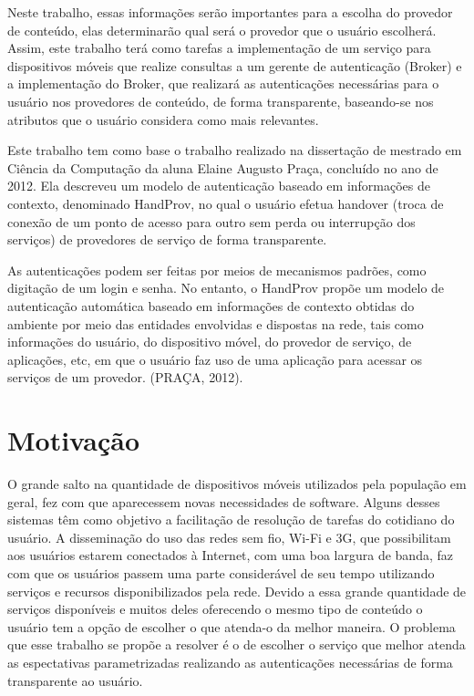 Neste trabalho, essas informações serão importantes para a escolha do provedor de conteúdo, elas determinarão qual será o provedor que o usuário escolherá. Assim, este trabalho terá como tarefas a implementação de um serviço para dispositivos móveis que realize consultas a um gerente de autenticação (Broker) e a implementação do Broker, que realizará as autenticações necessárias para o usuário nos provedores de conteúdo, de forma transparente, baseando-se nos atributos que o usuário considera como mais relevantes.

Este trabalho tem como base o trabalho realizado na dissertação de mestrado em Ciência da Computação da aluna Elaine Augusto Praça, concluído no ano de 2012. Ela descreveu um modelo de autenticação baseado em informações de contexto, denominado HandProv, no qual o usuário efetua handover (troca de conexão de um ponto de acesso para outro sem perda ou interrupção dos serviços) de provedores de serviço de forma transparente.

\begin{citacao}
As autenticações podem ser feitas por meios de mecanismos padrões, como digitação de um login e senha. No entanto, o HandProv propõe um modelo de autenticação automática baseado em informações de contexto obtidas do ambiente por meio das entidades envolvidas e dispostas na rede, tais como informações do usuário, do dispositivo móvel, do provedor de serviço, de aplicações, etc, em que o usuário faz uso de uma aplicação para acessar os serviços de um provedor. (PRAÇA, 2012).
\end{citacao}

\section{Motivação}
O grande salto na quantidade de dispositivos móveis utilizados pela população em geral, fez com que aparecessem novas necessidades de software. Alguns desses sistemas têm como objetivo a facilitação de resolução de tarefas do cotidiano do usuário.
A disseminação do uso das redes sem fio, Wi-Fi e 3G, que possibilitam aos usuários estarem conectados à Internet, com uma boa largura de banda, faz com que os usuários passem uma parte considerável de seu tempo utilizando serviços e recursos disponibilizados pela rede.
Devido a essa grande quantidade de serviços disponíveis e muitos deles oferecendo o mesmo tipo de conteúdo o usuário tem a opção de escolher o que atenda-o da melhor maneira.
O problema que esse trabalho se propõe a resolver é o de escolher o serviço que melhor atenda as espectativas parametrizadas realizando as autenticações necessárias de forma transparente ao usuário.

